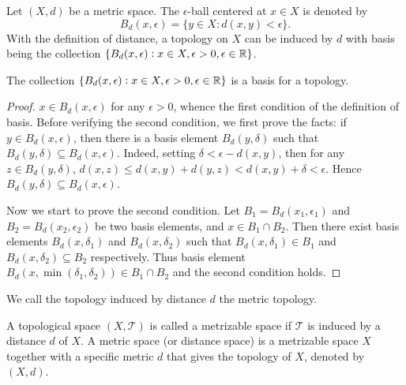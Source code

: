 Let $(X, d)$ be a metric space. 
The $\epsilon$-ball centered at $x \in X$ is denoted by 
\begin{equation*}
    B_d(x, \epsilon) = \{y \in X: d(x, y) < \epsilon\}. 
\end{equation*}
With the definition of distance, a topology on $X$ can be induced by $d$ 
with basis being the collection $\{B_d(x, \epsilon): x \in X, 
\epsilon > 0, \epsilon \in \mathbb{R}\}$. 
\begin{thm}
The collection $\{B_d(x, \epsilon): x \in X, \epsilon > 0, \epsilon \in 
\mathbb{R}\}$ is a basis for a topology. 
\end{thm}
\begin{proof}
$x \in B_d(x, \epsilon)$ for any $\epsilon > 0$, whence the first 
condition of the definition of basis. 
Before verifying the second condition, we first prove the facts: 
if $y \in B_d(x, \epsilon)$, then there is a basis element $B_d(y, \delta)$ 
such that $B_d(y, \delta) \subseteq B_d(x, \epsilon)$. 
Indeed, setting $\delta < \epsilon - d(x, y)$, then for any $z \in 
B_d(y, \delta)$, $d(x, z) \le d(x, y) + d(y, z) < d(x, y) + \delta 
< \epsilon$. Hence $B_d(y, \delta) \subseteq B_d(x, \epsilon)$. 

Now we start to prove the second condition. 
Let $B_1 = B_d(x_1, \epsilon_1)$ and $B_2 = B_d(x_2, \epsilon_2)$ be two 
basis elements, and $x \in B_1 \cap B_2$. 
Then there exist basis elements $B_d(x, \delta_1)$ and $B_d(x, \delta_2)$ 
such that $B_d(x, \delta_1) \in B_1$ and $B_d(x, \delta_2) \subseteq B_2$ 
respectively. 
Thus basis element $B_d(x, \min(\delta_1, \delta_2)) \in B_1 \cap B_2$ and 
the second condition holds.    
\end{proof}

\begin{defn}
We call the topology induced by distance $d$ the metric topology. 

A topological space $(X, \mathcal{T})$ is called a metrizable space if 
$\mathcal{T}$ is induced by a distance $d$ of $X$. 
A  metric space (or distance space) is a metrizable space $X$ together with 
a specific metric $d$ that gives the topology of $X$, denoted by $(X, d)$. 
\end{defn}


